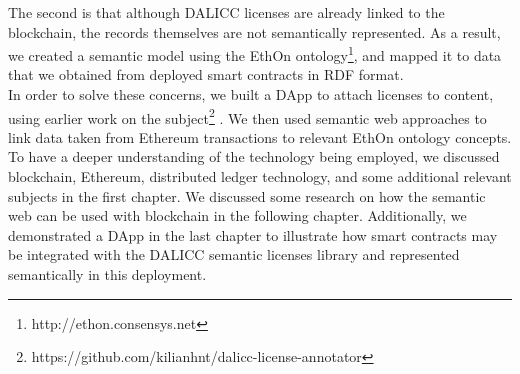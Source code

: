 The second is that although DALICC licenses are already linked to the blockchain, the records themselves are not semantically represented. As a result, we created a semantic model using the EthOn ontology\footnote{http://ethon.consensys.net}, and mapped it to data that we obtained from deployed smart contracts in RDF format. \\
In order to solve these concerns, we built a DApp to attach licenses to content, using earlier work on the subject\footnote{https://github.com/kilianhnt/dalicc-license-annotator} \cite{David}. We then used semantic web approaches to link data taken from Ethereum transactions to relevant EthOn ontology concepts. \\
To have a deeper understanding of the technology being employed, we discussed blockchain, Ethereum, distributed ledger technology, and some additional relevant subjects in the first chapter. We discussed some research on how the semantic web can be used with blockchain in the following chapter. Additionally, we demonstrated a DApp in the last chapter to illustrate how smart contracts may be integrated with the DALICC semantic licenses library and represented semantically in this deployment. \\